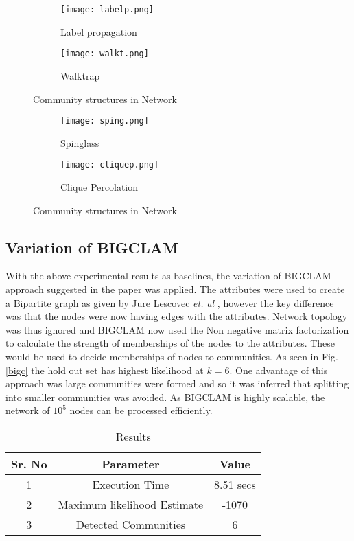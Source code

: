 \begin{figure}[H]
  \begin{subfigure}[b]{0.3\linewidth}
    \texttt{[image: labelp.png]}
    \caption{Label propagation}
    \label{labelp}
  \end{subfigure}
  \hfill %
  \begin{subfigure}[b]{0.3\linewidth}
    \texttt{[image: walkt.png]}
    \caption{Walktrap}
    \label{walkt}
  \end{subfigure}
 \caption{Community structures in Network}
\end{figure}

\begin{figure}[H]
  \begin{subfigure}[b]{0.3\linewidth}
    \texttt{[image: sping.png]}
    \caption{Spinglass}
    \label{sping}
  \end{subfigure}
  \hfill %
  \begin{subfigure}[b]{0.3\linewidth}
    \texttt{[image: cliquep.png]}
    \caption{Clique Percolation}
    \label{cliquep}
  \end{subfigure}
  \caption{Community structures in Network}
\end{figure}

\subsection{Variation of BIGCLAM}
With the above experimental results as baselines, the variation of BIGCLAM approach suggested in the paper was applied. The attributes were used to create a Bipartite graph as given by Jure Lescovec \textit{et. al} \cite{aps:53}, however the key difference was that the nodes were now having edges with the attributes. Network topology was thus ignored and BIGCLAM now used the Non negative matrix factorization to calculate the strength of memberships of the nodes to the attributes. These would be used to decide memberships of nodes to communities. As seen in Fig.\ref{bigc} the hold out set has highest likelihood at $k=6$. One advantage of this approach was large communities were formed and so it was inferred that splitting into smaller communities was avoided. As BIGCLAM is highly scalable, the network of $10^5$ nodes can be processed efficiently.

\begin{table}[H]
\renewcommand{\arraystretch}{1.3}
\caption{Results}
\label{table}
\centering
\begin{tabular}{|c|c|c|}
  \hline
\multicolumn{1}{|c|}{\textbf{Sr. No}} & \multicolumn{1}{c|}{\textbf{Parameter}} & \multicolumn{1}{c|}{\textbf{Value}} \\
  \hline
  1 & Execution Time &  8.51 secs \\
   \hline
  2 & Maximum likelihood Estimate &  -1070 \\
  \hline
   3 & Detected Communities &  6 \\
  \hline
\end{tabular}
\end{table}

